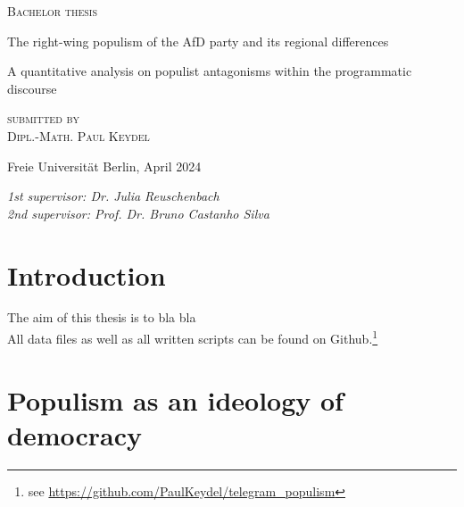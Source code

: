 \documentclass[a4paper]{scrreprt}
\begin{document}
\begin{titlepage}
\centering
{\large\textsc{Bachelor thesis}\par}
\vspace{8\baselineskip}
{\Huge The right-wing populism of the AfD party and its regional differences\par}
\vspace{2\baselineskip}
{\Large A quantitative analysis on populist antagonisms within the programmatic discourse\par}
\vspace{5\baselineskip}
{\large\textsc{submitted by\\[.5em]Dipl.-Math. Paul Keydel}\par}
\vspace{8\baselineskip}
{Freie Universität Berlin, April 2024\par}
\vfill
\raggedright
{\em 1st supervisor: Dr. Julia Reuschenbach\\}
{\em 2nd supervisor: Prof. Dr. Bruno Castanho Silva}
\end{titlepage}

\tableofcontents

\chapter{Introduction}
The aim of this thesis is to bla bla\\
All data files as well as all written scripts can be found on Github.\footnote{see \url{https://github.com/PaulKeydel/telegram_populism}}
\chapter{Populism as an ideology of democracy}
\end{document}
